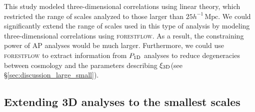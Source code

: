 \documentclass[longauth]{aa}
\newcommand{\poned}{\ensuremath{P_{\rm 1D}}\xspace}
\newcommand{\xithreed}{\ensuremath{\xi_{\rm 3D}}\xspace}
\newcommand{\forestflow}{\textsc{forestflow}\xspace}
\newcommand{\hMpc}{h^{-1}\,\mathrm{Mpc}}
\begin{document}
This study modeled three-dimensional correlations using linear theory, which restricted the range of scales analyzed to those larger than $25 \hMpc$. We could significantly extend the range of scales used in this type of analysis by modeling three-dimensional correlations using \forestflow. As a result, the constraining power of AP analyses would be much larger. Furthermore, we could use \forestflow to extract information from \poned analyses to reduce degeneracies between cosmology and the parameters describing \xithreed (see \S\ref{sec:discussion_large_small}).


\subsection{Extending 3D analyses to the smallest scales}
\end{document}
